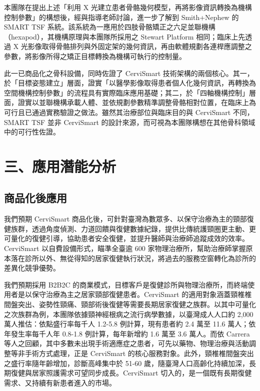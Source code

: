 \documentclass[12pt,a4paper]{article}
\begin{document}
本團隊在提出上述「利用 X 光建立患者骨骼幾何模型，再將影像資訊轉換為機構控制參數」的構想後，經與指導老師討論，進一步了解到 Smith+Nephew 的 SMART TSF 系統\cite{smith-nephew2022}。該系統為一應用於四肢骨骼矯正之六足並聯機構（hexapod），其機構原理與本團隊所採用之 Stewart Platform 相同；臨床上先透過 X 光影像取得骨骼排列與外固定架的幾何資訊，再由軟體規劃各連桿應調整之參數，將影像所得之矯正目標轉換為機構可執行的控制量。

此一已商品化之骨科設備，同時佐證了 CerviSmart 技術架構的兩個核心。其一，於「目標姿態建立」層面，證實「以醫學影像取得患者個人化幾何資訊，再轉換為空間機構控制參數」的流程具有實際臨床應用基礎；其二，於「四軸機構控制」層面，證實以並聯機構承載人體、並依規劃參數精準調整骨骼相對位置，在臨床上為可行且已通過實務驗證之做法。雖然其治療部位與臨床目的與 CerviSmart 不同，SMART TSF 並非 CerviSmart 的設計來源，而可視為本團隊構想在其他骨科領域中的可行性佐證。

\section{三、應用潛能分析}

\subsection{商品化後應用}

我們預期 CerviSmart 商品化後，可針對臺灣為數眾多、以保守治療為主的頸部復健族群，透過角度偵測、力道回饋與復健數據紀錄，提供比傳統護頸圈更主動、更可量化的復健引導，協助患者安全復健，並提升醫師與治療師追蹤成效的效率。CerviSmart 以自費設備形式，瞄準全臺逾 600 家物理治療所，幫助治療師掌握原本落在診所以外、無從得知的居家復健執行狀況，將過去的服務空窗轉化為診所的差異化競爭優勢。

我們預期採用 B2B2C 的商業模式，目標客戶是復健診所與物理治療所，而終端使用者是以保守治療為主之居家頸部復健患者。CerviSmart 的適用對象涵蓋頸椎椎間盤突出、姿勢性頸痛、頸部術後復健等需要長期居家復健之族群。以其中可量化之次族群為例，本團隊依據頸神經根病之流行病學數據\cite{mansfield2020}，以臺灣成人人口約 2,000 萬人推估：依點盛行率每千人 1.2-5.8 例計算，現有患者約 2.4 萬至 11.6 萬人；依年發生率每千人年 0.8-1.8 例計算，每年新增約 1.6 萬至 3.6 萬人。而依 Carrera 等人之回顧，其中多數未出現手術適應症之患者，可先以藥物、物理治療與活動調整等非手術方式處理\cite{carrera2026}，正是 CerviSmart 的核心服務對象。此外，頸椎椎間盤突出之盛行率隨年齡增加，診斷高峰集中於 51-60 歲\cite{carrera2026}，隨臺灣人口高齡化持續加深，長期復健與居家照護需求可望同步成長。CerviSmart 切入的，是一個既有長期復健需求、又持續有新患者進入的市場。
\end{document}
